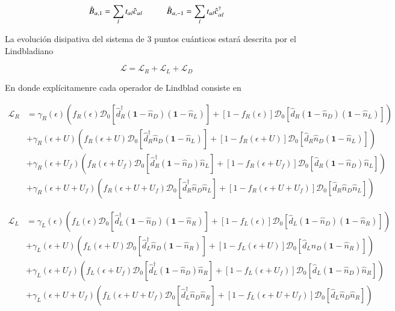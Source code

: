 \begin{equation*}
    \hat{B}_{\alpha,1} = \sum_{l}t_{\alpha l} \hat{c}_{\alpha l} \hspace{10mm} \hat{B}_{\alpha,-1} = \sum_{l}t_{\alpha l} \hat{c}^{\dagger}_{\alpha l}
\end{equation*}

La evolución disipativa del sistema de 3 puntos cuánticos estará descrita por el Lindbladiano 

\begin{equation}
    \mathcal{L} = \mathcal{L}_{R} + \mathcal{L}_{L} + \mathcal{L}_{D}
    \label{Lindbladsec5}
\end{equation}

En donde explícitamenre cada operador de Lindblad consiste en

\begin{align*}
    \mathcal{L}_{R} & = \gamma_{R}(\epsilon)(f_{R}(\epsilon)\mathcal{D}_{0}[\hat{d}^{\dagger}_{R}(\textbf{1}-\hat{n}_{D})(\textbf{1}-\hat{n}_{L}) ]  + [1-f_{R}(\epsilon)]\mathcal{D}_{0}[\hat{d}_{R}(\textbf{1}-\hat{n}_{D})(\textbf{1}-\hat{n}_{L}) ]  )  \\
                    & + \gamma_{R}(\epsilon+U)(f_{R}(\epsilon+U)\mathcal{D}_{0}[\hat{d}^{\dagger}_{R}\hat{n}_{D}(\textbf{1}-\hat{n}_{L}) ]  + [1-f_{R}(\epsilon+U)]\mathcal{D}_{0}[\hat{d}_{R}\hat{n}_{D}(\textbf{1}-\hat{n}_{L}) ]  ) \\
                   & + \gamma_{R}(\epsilon+U_{f})(f_{R}(\epsilon+U_{f})\mathcal{D}_{0}[\hat{d}^{\dagger}_{R}(\textbf{1}-\hat{n}_{D})\hat{n}_{L} ]  + [1-f_{R}(\epsilon+U_{f})]\mathcal{D}_{0}[\hat{d}_{R}(\textbf{1}-\hat{n}_{D})\hat{n}_{L} ]  ) \\
                  & + \gamma_{R}(\epsilon+U+U_{f})(f_{R}(\epsilon+U+U_{f})\mathcal{D}_{0}[\hat{d}^{\dagger}_{R}\hat{n}_{D}\hat{n}_{L} ]  + [1-f_{R}(\epsilon+U+U_{f})]\mathcal{D}_{0}[\hat{d}_{R}\hat{n}_{D}\hat{n}_{L} ]  ) 
\end{align*}

\begin{align*}
    \mathcal{L}_{L} & = \gamma_{L}(\epsilon)(f_{L}(\epsilon)\mathcal{D}_{0}[\hat{d}^{\dagger}_{L}(\textbf{1}-\hat{n}_{D})(\textbf{1}-\hat{n}_{R}) ]  + [1-f_{L}(\epsilon)]\mathcal{D}_{0}[\hat{d}_{L}(\textbf{1}-\hat{n}_{D})(\textbf{1}-\hat{n}_{R}) ]  )  \\
                    & + \gamma_{L}(\epsilon+U)(f_{L}(\epsilon+U)\mathcal{D}_{0}[\hat{d}^{\dagger}_{L}\hat{n}_{D}(\textbf{1}-\hat{n}_{R}) ]  + [1-f_{L}(\epsilon+U)]\mathcal{D}_{0}[\hat{d}_{L}\hat{n}_{D}(\textbf{1}-\hat{n}_{R}) ]  ) \\
                   & + \gamma_{L}(\epsilon+U_{f})(f_{L}(\epsilon+U_{f})\mathcal{D}_{0}[\hat{d}^{\dagger}_{L}(\textbf{1}-\hat{n}_{D})\hat{n}_{R} ]  + [1-f_{L}(\epsilon+U_{f})]\mathcal{D}_{0}[\hat{d}_{L}(\textbf{1}-\hat{n}_{D})\hat{n}_{R} ]  ) \\
                  & + \gamma_{L}(\epsilon+U+U_{f})(f_{L}(\epsilon+U+U_{f})\mathcal{D}_{0}[\hat{d}^{\dagger}_{L}\hat{n}_{D}\hat{n}_{R} ]  + [1-f_{L}(\epsilon+U+U_{f})]\mathcal{D}_{0}[\hat{d}_{L}\hat{n}_{D}\hat{n}_{R} ]  ) 
\end{align*}


